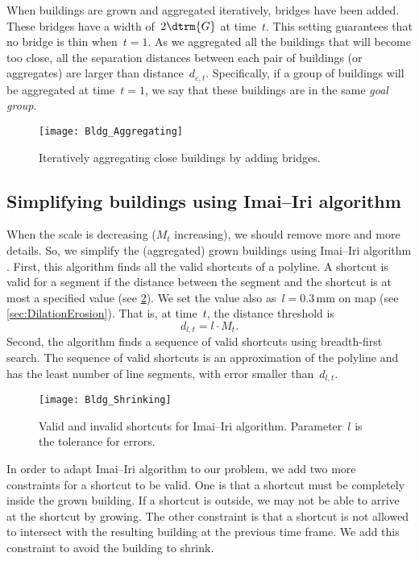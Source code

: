 When buildings are grown and aggregated iteratively, 
bridges have been added. 
These bridges have a width of~$2\dtrm{G}$ at time~$t$.
This setting guarantees that no bridge is thin when~$t=1$.
As we aggregated all the buildings that will become too close, 
all the separation distances between each pair of buildings (or aggregates) are larger than distance~$d_{\varepsilon, t}$.
Specifically, if a group of buildings 
will be aggregated at time~$t=1$, 
we say that these buildings are in the same \emph{goal group}. 

\begin{figure}[tb]
	\centering
	\texttt{[image: Bldg\_Aggregating]}
	\caption{Iteratively aggregating close buildings 
		by adding bridges.
	}
	\label{fig:BridgeMoreBuilding}
\end{figure}

\subsection{Simplifying buildings using Imai--Iri algorithm}
\label{sec:ImaiIri}

When the scale is decreasing ($M_t$ increasing), 
we should remove more and more details. 
So, we simplify the (aggregated) grown buildings
using Imai--Iri algorithm \citep{ImaiIri1988}.
First, this algorithm finds 
all the valid shortcuts of a polyline.
A shortcut is valid for a segment 
if the distance between the segment and the shortcut 
is at most a specified value
(see \fig\ref{fig:ImaiIri_Shortcut}).
We set the value also as~$l=0.3\,\mathrm{mm}$ on map
(see \sect\ref{sec:DilationErosion}). 
That is, at time~$t$, the distance threshold is
\begin{equation}
\label{eq:d_lt}
d_{l,t}= l \cdot M_t.
\end{equation}
Second, the algorithm finds a sequence of valid shortcuts
using breadth-first search.
The sequence of valid shortcuts 
is an approximation of the polyline 
and has the least number of line segments, 
with error smaller than~$d_{l,t}$.

\begin{figure}[tb]
	\centering
	\texttt{[image: Bldg\_Shrinking]}
	\caption{Valid and invalid shortcuts 
		for Imai--Iri algorithm.
		Parameter~$l$ is the tolerance for errors.}
	\label{fig:ImaiIri_Shortcut}
\end{figure}

In order to adapt Imai--Iri algorithm to our problem,
we add two more constraints for a shortcut to be valid. 
One is that a shortcut must be 
completely inside the grown building.
If a shortcut is outside,
we may not be able to arrive at the shortcut by growing.
The other constraint is that 
a shortcut is not allowed to intersect with
the resulting building at the previous time frame.
We add this constraint 
to avoid the building to shrink.

